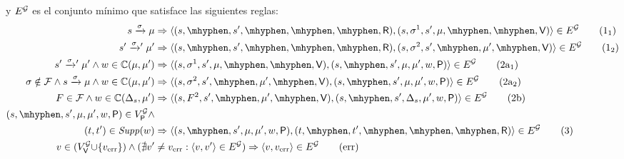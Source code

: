 \begin{definition}
{  }%
%
  y $E^{\mathcal{G}}$ es el conjunto mínimo que satisface las siguientes reglas:
%
  {\footnotesize%
  \begin{align*}
    s \xrightarrow{\sigma} \mu
    & \Rightarrow \tuple{(s, \mhyphen, s', \mhyphen, \mhyphen, \mhyphen, \Refuter), (s, \sigma^{1}, s', \mu, \mhyphen, \mhyphen, \Verifier)}\in E^\StochG
    \tag{1$_1$}\label{play:r:1}\\
    s' \xrightarrowprime{\sigma} \mu'
    & \Rightarrow \tuple{(s, \mhyphen, s', \mhyphen, \mhyphen, \mhyphen, \Refuter),(s, \sigma^{2}, s', \mhyphen, \mu', \mhyphen, \Verifier)}\in E^\StochG
    \tag{1$_2$}\label{play:r:2}\\
    {s' \xrightarrowprime{\sigma} \mu'} \wedge {w \in \couplings{\mu}{\mu'}}
    & \Rightarrow \tuple{(s, \sigma^1, s', \mu, \mhyphen, \mhyphen, \Verifier),(s, \mhyphen, s', \mu, \mu', w, \Probabilistic)}\in E^\StochG
    \tag{2a$_1$}\label{play:v:1}\\
    \!\!\!{\sigma \notin \faults} \wedge {s \xrightarrow{\sigma} \mu} \wedge {w \in \couplings{\mu}{\mu'}}
    & \Rightarrow \tuple{(s, \sigma^2, s', \mhyphen, \mu', \mhyphen, \Verifier), (s, \mhyphen, s', \mu, \mu', w, \Probabilistic)}\in E^\StochG
    \tag{2a$_2$}\label{play:v:2a}\\
    {F \in \faults} \wedge {w \in \couplings{\Dirac_s}{\mu'}}
    & \Rightarrow \tuple{(s, F^2, s', \mhyphen, \mu', \mhyphen, \Verifier), (s, \mhyphen, s', \Dirac_s, \mu', w, \Probabilistic)}\in E^\StochG
    \tag{2b}\label{play:v:2b}\\
    (s, \mhyphen, s', \mu, \mu', w, \Probabilistic) \in V^\StochG_\Probabilistic \wedge & \\ 
    (t,t') \in \support{w} 
    & \Rightarrow \tuple{(s, \mhyphen, s', \mu, \mu', w, \Probabilistic), (t, \mhyphen, t', \mhyphen, \mhyphen, \mhyphen, \Refuter)}\in E^\StochG
    \tag{3}\label{play:p}\\
    {v\in (V^\StochG_\Verifier{\cup}\{\ErrorSt\})} \wedge ({\nexists v'} & {}\neq\ErrorSt : {\tuple{v,v'}\in E^\StochG})
    \Rightarrow  \tuple{v,\ErrorSt}\in E^\StochG
    \tag{err}\label{play:err}
  \end{align*}
  }%
\end{definition}




